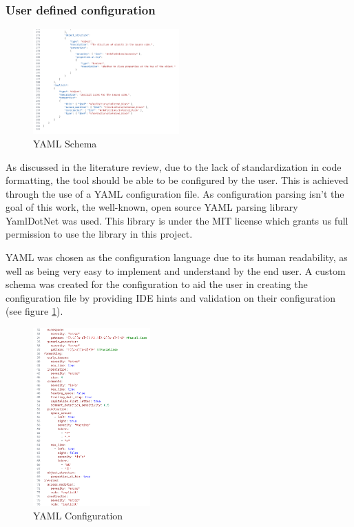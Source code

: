 \subsubsection{User defined configuration}

\begin{figure}
    \centering
    \caption{YAML Schema}
    \label{fig:YAMLSchema}
    \includegraphics[width=0.5\textwidth]{Figures/YAMLSchemaCropped.png}
\end{figure}

As discussed in the literature review, due to the lack of standardization in code formatting, the tool should be able to be configured by the user. This is achieved through the use of a YAML configuration file. As configuration parsing isn't the goal of this work, the well-known, open source YAML parsing library YamlDotNet was used. This library is under the MIT license which grants us full permission to use the library in this project.

YAML was chosen as the configuration language due to its human readability, as well as being very easy to implement and understand by the end user. A custom schema was created for the configuration to aid the user in creating the configuration file by providing IDE hints and validation on their configuration (see figure \ref{fig:YAMLSchema}).

\begin{figure}
    \centering
    \caption{YAML Configuration}
    \label{fig:YAMLConfiguration}
    \includegraphics[width=0.4\textwidth]{Figures/YAMLConfigurationCropped.png}
\end{figure}

